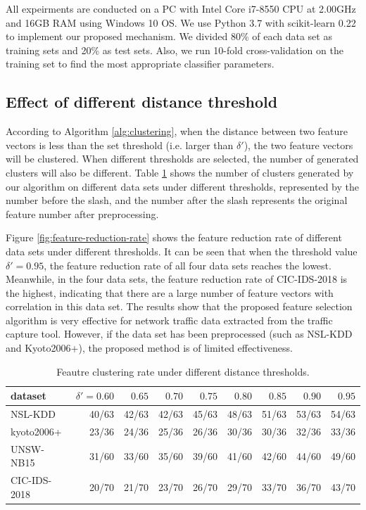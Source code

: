 \documentclass{ieeeaccess}
\theoremstyle{definition}
\begin{document}
All expeirments are conducted on a PC with Intel Core i7-8550 CPU at 2.00GHz and 16GB RAM using Windows 10 OS. We use Python 3.7 with scikit-learn 0.22 \cite{sklearn} to implement our proposed mechanism. We divided 80\% of each data set as training sets and 20\% as test sets. Also, we run 10-fold cross-validation on the training set to find the most appropriate classifier parameters.

\subsection{Effect of different distance threshold}

According to Algorithm \ref{alg:clustering}, when the distance between two feature vectors is less than the set threshold (i.e. larger than $\delta'$), the two feature vectors will be clustered. When different thresholds are selected, the number of generated clusters will also be different. Table \ref{tab:clustering-rate} shows the number of clusters generated by our algorithm on different data sets under different thresholds, represented by the number before the slash, and the number after the slash represents the original feature number after preprocessing.

Figure \ref{fig:feature-reduction-rate} shows the feature reduction rate of different data sets under different thresholds. It can be seen that when the threshold value $\delta' = 0.95$, the feature reduction rate of all four data sets reaches the lowest. Meanwhile, in the four data sets, the feature reduction rate of CIC-IDS-2018 is the highest, indicating that there are a large number of feature vectors with correlation in this data set. The results show that the proposed feature selection algorithm is very effective for network traffic data extracted from the traffic capture tool. However, if the data set has been preprocessed (such as NSL-KDD and Kyoto2006+), the proposed method is of limited effectiveness.

\begin{table}[htbp]
    \centering
    \caption{Feautre clustering rate under different distance thresholds.}
    \begin{tabular}{lrrrrrrrr}
        \toprule
        dataset & $\delta'=0.60$ & $0.65$ & $0.70$ & $0.75$ & $0.80$ & $0.85$ & $0.90$ & $0.95$ \\
        \midrule
        NSL-KDD & 40/63 & 42/63 & 42/63 & 45/63 & 48/63 & 51/63 & 53/63 & 54/63 \\
        kyoto2006+ & 23/36 & 24/36 & 25/36 & 26/36 & 30/36 & 30/36 & 32/36 & 33/36 \\
        UNSW-NB15 & 31/60 & 33/60 & 35/60 & 39/60 & 41/60 & 42/60 & 44/60 & 49/60 \\
        CIC-IDS-2018 & 20/70 & 21/70 & 23/70 & 26/70 & 29/70 & 33/70 & 36/70 & 43/70 \\
        \bottomrule
    \end{tabular}%
    \label{tab:clustering-rate}%
\end{table}%
\end{document}
